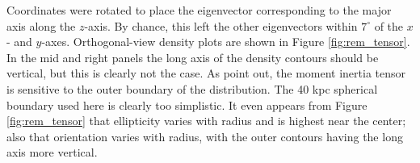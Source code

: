\documentclass[twocolumn]{aastex63}
\begin{document}
%
%
%

Coordinates were rotated to place the eigenvector corresponding to the major axis along the $z$-axis. By chance, this left the other eigenvectors within $7^\circ$ of the $x$- and $y$-axes. Orthogonal-view density plots are shown in Figure \ref{fig:rem_tensor}. In the mid and right panels the long axis of the density contours should be vertical, but this is clearly not the case. As \citet{jing_triaxial_2002} point out, the moment inertia tensor is sensitive to the outer boundary of the distribution. The 40 kpc spherical boundary used here is clearly too simplistic. It even appears from Figure \ref{fig:rem_tensor} that ellipticity varies with radius and is highest near the center; also that orientation varies with radius, with the outer contours having the long axis more vertical.
\end{document}
